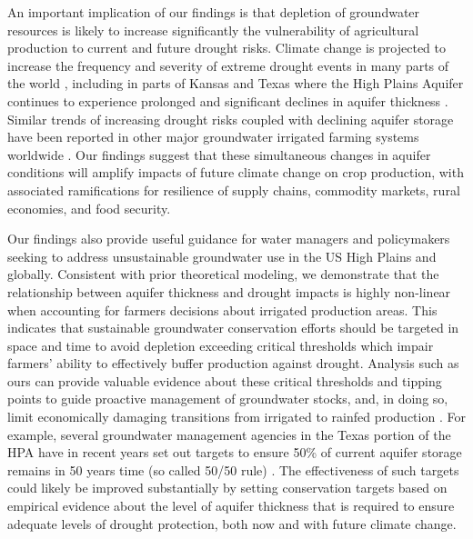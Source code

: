 \documentclass[
]{article}
\begin{document}
An important implication of our findings is that depletion of groundwater resources is likely to increase significantly the vulnerability of agricultural production to current and future drought risks. Climate change is projected to increase the frequency and severity of extreme drought events in many parts of the world \citep{ukkola2020robust, chiang2021evidence, cook2020twenty}, including in parts of Kansas and Texas \citep{bradford2020robust, cook2022projected, mullens2019quantitative} where the High Plains Aquifer continues to experience prolonged and significant declines in aquifer thickness \citep{scanlon2012groundwater, haacker2016water, cotterman2018groundwater}. Similar trends of increasing drought risks coupled with declining aquifer storage have been reported in other major groundwater irrigated farming systems worldwide \citep{wada2010global, doll2014global, famiglietti2014global, feng2018groundwater, bierkens2019non}. Our findings suggest that these simultaneous changes in aquifer conditions will amplify impacts of future climate change on crop production, with associated ramifications for resilience of supply chains, commodity markets, rural economies, and food security.

Our findings also provide useful guidance for water managers and policymakers seeking to address unsustainable groundwater use in the US High Plains and globally. Consistent with prior theoretical modeling, we demonstrate that the relationship between aquifer thickness and drought impacts is highly non-linear when accounting for farmers decisions about irrigated production areas. This indicates that sustainable groundwater conservation efforts \citep{macewan2017hydroecon, butler2020charting, elshall2020groundwater} should be targeted in space and time to avoid depletion exceeding critical thresholds which impair farmers' ability to effectively buffer production against drought. Analysis such as ours can provide valuable evidence about these critical thresholds and tipping points to guide proactive management of groundwater stocks, and, in doing so, limit economically damaging transitions from irrigated to rainfed production \citep{foster2017effects, deines2020transitions}. For example, several groundwater management agencies in the Texas portion of the HPA have in recent years set out targets to ensure 50\% of current aquifer storage remains in 50 years time (so called 50/50 rule) \citep{closas2018chronicle}. The effectiveness of such targets could likely be improved substantially by setting conservation targets based on empirical evidence about the level of aquifer thickness that is required to ensure adequate levels of drought protection, both now and with future climate change.
\end{document}
